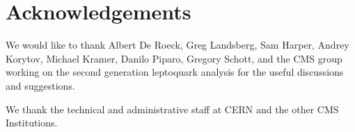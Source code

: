 
%

\section{Acknowledgements}

We would like to thank Albert De Roeck, Greg Landsberg, Sam Harper, 
Andrey Korytov, Michael Kramer, Danilo Piparo, Gregory Schott, and the CMS group working on 
the second generation leptoquark analysis for the useful discussions and suggestions.

%

We thank the technical and administrative staff at CERN and the other CMS Institutions.


%
